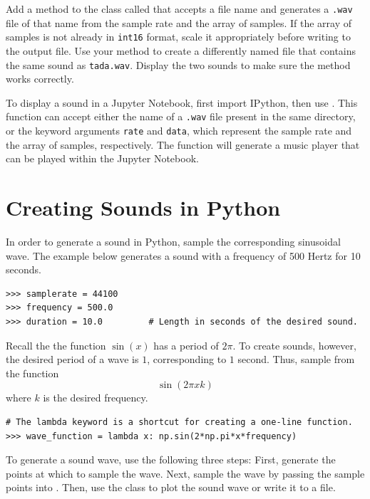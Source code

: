 \begin{problem}
Add a method to the  class called  that accepts a file name and generates a \texttt{.wav} file of that name from the sample rate and the array of samples.
If the array of samples is not already in \texttt{int16} format, scale it appropriately before writing to the output file.
Use your method to create a differently named file that contains the same sound as \texttt{tada.wav}.
Display the two sounds to make sure the method works correctly.
\begin{info}
To display a sound in a Jupyter Notebook, first import IPython, then use .
This function can accept either the name of a \texttt{.wav} file present in the same directory, or the keyword arguments \texttt{rate} and \texttt{data}, which represent the sample rate and the array of samples, respectively.
The function will generate a music player that can be played within the Jupyter Notebook.
\end{info}
\end{problem}

\section*{Creating Sounds in Python} %

In order to generate a sound in Python, sample the corresponding sinusoidal wave.
The example below generates a sound with a frequency of 500 Hertz for 10 seconds.

\begin{lstlisting}
>>> samplerate = 44100
>>> frequency = 500.0
>>> duration = 10.0         # Length in seconds of the desired sound.
\end{lstlisting}

Recall the the function $\sin(x)$ has a period of $2\pi$.
To create sounds, however, the desired period of a wave is $1$, corresponding to $1$ second.
Thus, sample from the function
\[
\sin(2\pi xk)
\]
where $k$ is the desired frequency.

\begin{lstlisting}
# The lambda keyword is a shortcut for creating a one-line function.
>>> wave_function = lambda x: np.sin(2*np.pi*x*frequency)
\end{lstlisting}

To generate a sound wave, use the following three steps:
First, generate the points at which to sample the wave.
Next, sample the wave by passing the sample points into .
Then, use the  class to plot the sound wave or write it to a file.

